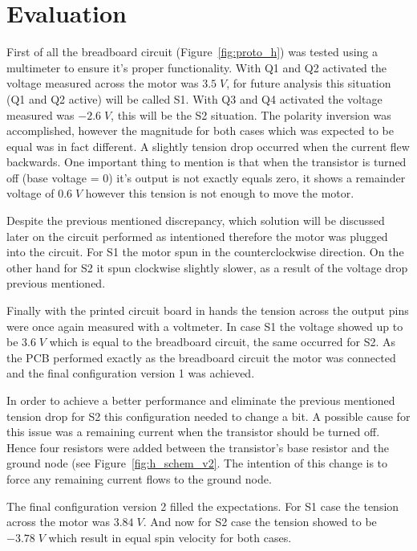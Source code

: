 \section{\textbf{Evaluation}}\label{sec:5}

	First of all the breadboard circuit (Figure~\ref{fig:proto_h}) was tested using a multimeter to ensure it's proper functionality. With Q1 and Q2 activated the voltage measured across the motor was $3.5\;V$, for future analysis this situation (Q1 and Q2 active) will be called S1. With Q3 and Q4 activated the voltage measured was $-2.6\;V$, this will be the S2 situation. The polarity inversion was accomplished, however the magnitude for both cases which was expected to be equal was in fact different. A slightly tension drop occurred when the current flew backwards. One important thing to mention is that when the transistor is turned off (base voltage = 0) it's output is not exactly equals zero, it shows a remainder voltage of $0.6\;V$ however this tension is not enough to move the motor.
	
	Despite the previous mentioned discrepancy, which solution will be discussed later on the circuit performed as intentioned therefore the motor was plugged into the circuit. For S1 the motor spun in the counterclockwise direction. On the other hand for S2 it spun clockwise slightly slower, as a result of the voltage drop previous mentioned.
	
	Finally with the printed circuit board in hands the tension across the output pins were once again measured with a voltmeter. In case S1 the voltage showed up to be $3.6\;V$ which is equal to the breadboard circuit, the same occurred for S2. As the PCB performed exactly as the breadboard circuit the motor was connected and the final configuration version 1 was achieved.
	
	In order to achieve a better performance and eliminate the previous mentioned tension drop for S2 this configuration needed to change a bit. A possible cause for this issue was a remaining current when the transistor should be turned off. Hence four resistors were added between the transistor's base resistor and the ground node (see Figure~\ref{fig:h_schem_v2}. The intention of this change is to force any remaining current flows to the ground node.
	
	The final configuration version 2 filled the expectations. For S1 case the tension across the motor was $3.84\;V$. And now for S2 case the tension showed to be $-3.78\;V$ which result in equal spin velocity for both cases.
	
